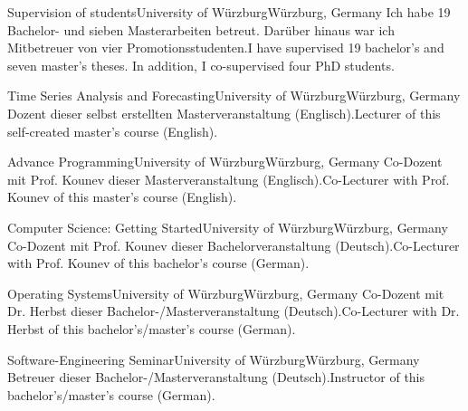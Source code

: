 
\begin{cventries}

    {Supervision of students}{University of Würzburg}{Würzburg, Germany}%
    {} %
    {Ich habe 19 Bachelor- und sieben Masterarbeiten betreut. Darüber hinaus war ich Mitbetreuer von vier Promotionsstudenten.}{I have supervised 19 bachelor's and seven master's theses. In addition, I co-supervised four PhD students.}

    {Time Series Analysis and Forecasting}{University of Würzburg}{Würzburg, Germany}%
    {} %
    {Dozent dieser selbst erstellten Masterveranstaltung (Englisch).}{Lecturer of this self-created master's course (English).}

    {Advance Programming}{University of Würzburg}{Würzburg, Germany}%
    {} %
    {Co-Dozent mit Prof. Kounev dieser Masterveranstaltung (Englisch).}{Co-Lecturer with Prof. Kounev of this master's course (English).}

    {Computer Science: Getting Started}{University of Würzburg}{Würzburg, Germany}%
    {} %
    {Co-Dozent mit Prof. Kounev dieser Bachelorveranstaltung (Deutsch).}{Co-Lecturer with Prof. Kounev of this bachelor's course (German).}

    {Operating Systems}{University of Würzburg}{Würzburg, Germany}%
    {} %
    {Co-Dozent mit Dr. Herbst dieser Bachelor-/Masterveranstaltung (Deutsch).}{Co-Lecturer with Dr. Herbst of this bachelor's/master's course (German).}

    {Software-Engineering Seminar}{University of Würzburg}{Würzburg, Germany}%
    {} %
    {Betreuer dieser Bachelor-/Masterveranstaltung (Deutsch).}{Instructor of this bachelor's/master's course (German).}


\end{cventries}
